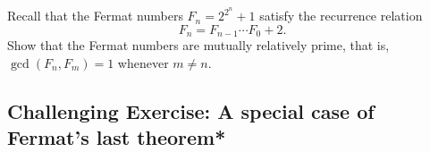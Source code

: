 \documentclass[11pt,dvipsnames]{book}
\numberwithin{equation}{section} %
\numberwithin{figure}{section} %
\numberwithin{table}{section} %
\begin{document}
\begin{exercise} Recall that the Fermat numbers $F_{n}=2^{2^{n}}+1$ satisfy the recurrence relation
\[
F_{n} = F_{n-1}\cdots F_{0}+2.
\]
Show that the Fermat numbers are mutually relatively prime, that is, $\gcd(F_{n},F_{m})=1$ whenever $m\neq n$. 








\end{exercise}


\subsection{  Challenging Exercise: A special case of Fermat's last theorem*}
\end{document}
